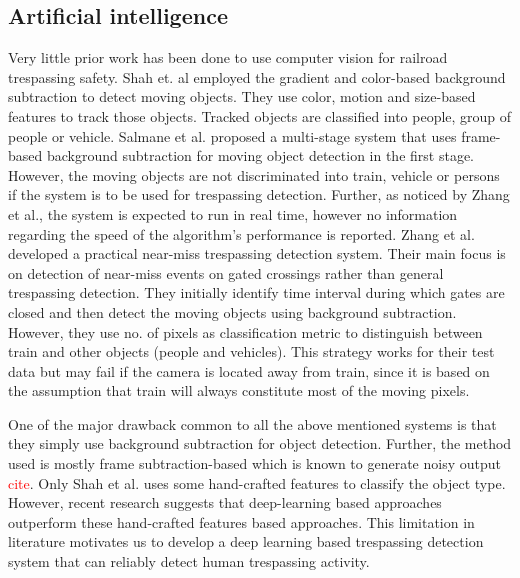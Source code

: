 \subsection{Artificial intelligence} Very little prior work has been done to use computer vision for railroad trespassing safety. Shah et. al\cite{shah2007automated} employed the gradient and color-based background subtraction to detect moving objects. They use color, motion and size-based features to track those objects. Tracked objects are classified into people, group of people or vehicle. Salmane et al.\cite{salmane2015video} proposed a multi-stage system that uses frame-based background subtraction for moving object detection in the first stage. However, the moving objects are not discriminated into train, vehicle or persons if the system is to be used for trespassing detection. Further, as noticed by Zhang et al.\cite{zhang2018automated}, the system is expected to run in real time, however no information regarding the
speed of the algorithm's performance is reported. Zhang et al.\cite{zhang2018automated} developed a practical near-miss trespassing detection system. Their main focus is on detection of near-miss events on gated crossings rather than general trespassing detection. They initially identify time interval during which gates are closed and then detect the moving objects using background subtraction. However, they use no. of pixels as classification metric to distinguish between train and other objects (people and vehicles). This strategy works for their test data but may fail if the camera is located away from train, since it is based on the assumption that train will always constitute most of the moving pixels. 

One of the major drawback common to all the above mentioned systems is that they simply use background subtraction for object detection. Further, the method used is mostly frame subtraction-based which is known to generate noisy output \textcolor{red}{cite}. Only Shah et al.\cite{shah2007automated} uses some hand-crafted features to classify the object type. However, recent research suggests that deep-learning based approaches outperform these hand-crafted features based approaches\cite{benenson2014ten}. This limitation in literature motivates us to develop a deep learning based trespassing detection system that can reliably detect human trespassing activity. 

